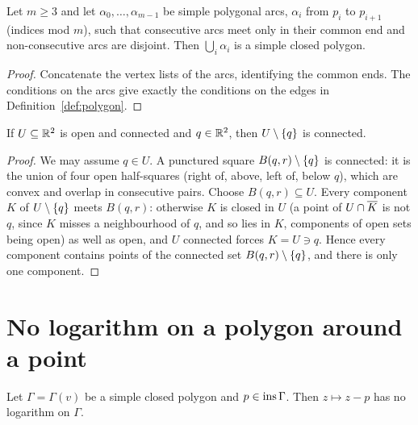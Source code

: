 \begin{lemma}\label{lem:closed-chain}
Let $m\ge3$ and let $\alpha_0,\dots,\alpha_{m-1}$ be simple polygonal arcs, $\alpha_i$ from $p_i$ to
$p_{i+1}$ (indices mod $m$), such that consecutive arcs meet only in their common end and
non-consecutive arcs are disjoint. Then $\bigcup_i\alpha_i$ is a simple closed polygon.
\end{lemma}

\begin{proof}
Concatenate the vertex lists of the arcs, identifying the common ends. The conditions on the arcs
give exactly the conditions on the edges in Definition~\ref{def:polygon}.
\end{proof}


\begin{proposition}\label{prop:open-minus-point}
If $U\subseteq\mathbb{R}^2$ is open and connected and $q\in\mathbb{R}^2$, then $U\setminus\left\{ q \right\}$ is connected.
\end{proposition}

\begin{proof}
We may assume $q\in U$. A punctured square $B(q,r)\setminus\left\{ q \right\}$ is connected: it is the union of
four open half-squares (right of, above, left of, below $q$), which are convex and overlap in
consecutive pairs. Choose $B(q,r)\subseteq U$. Every component $K$ of $U\setminus\left\{ q \right\}$ meets
$B(q,r)$: otherwise $K$ is closed in $U$ (a point of $U\cap\overline{K}$ is not $q$, since $K$ misses a
neighbourhood of $q$, and so lies in $K$, components of open sets being open) as well as open, and
$U$ connected forces $K=U\ni q$. Hence every component contains points of the connected set
$B(q,r)\setminus\left\{ q \right\}$, and there is only one component.
\end{proof}


\section{No logarithm on a polygon around a point}

\begin{theorem}\label{thm:nolog-polygon}
Let $\Gamma=\Gamma(v)$ be a simple closed polygon and $p\in\operatorname{ins}\Gamma$. Then $z\mapsto z-p$ has no
logarithm on $\Gamma$.
\end{theorem}

